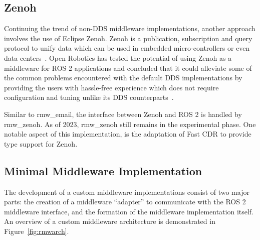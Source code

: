     \subsection{Zenoh}

        Continuing the trend of non-\ac{DDS} middleware implementations, another approach involves the use of Eclipse Zenoh. Zenoh is a publication, subscription and query protocol to unify data which can be used in embedded micro-controllers or even data centers~\cite{zenoh}. Open Robotics has tested the potential of using Zenoh as a middleware for ROS 2 applications and concluded that it could alleviate some of the common problems encountered with the default \ac{DDS} implementations by providing the users with hassle-free experience which does not require configuration and tuning unlike its \ac{DDS} counterparts~\cite{ros2zenoh}.

        Similar to \textsf{rmw\_email}, the interface between Zenoh and \ac{ROS} 2 is handled by \textsf{rmw\_zenoh}. As of 2023, \textsf{rmw\_zenoh} still remains in the experimental phase. One notable aspect of this implementation, is the adaptation of Fast CDR to provide type support for Zenoh.

    \subsection{Minimal Middleware Implementation}\label{ssec:minimal}

        The development of a custom middleware implementations consist of two major parts: the creation of a middleware ``adapter'' to communicate with the \ac{ROS} 2 middleware interface, and the formation of the middleware implementation itself. An overview of a custom middleware architecture is demonstrated in Figure~\ref{fig:rmwarch}. 

